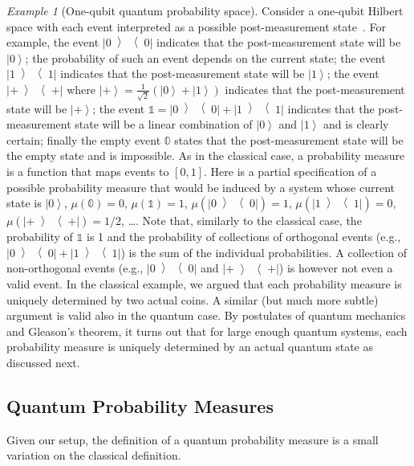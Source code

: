 \documentclass{article}
\theoremstyle{remark}
\newtheorem{example}{Example}
\newcommand{\ket}[1]{{\left\vert{#1}\right\rangle}}
\newcommand{\op}[2]{\ensuremath{\left\vert{#1}\middle\rangle\middle\langle{#2}\right\vert}}
\newcommand{\proj}[1]{\op{#1}{#1}}
\newcommand{\ps}{\texttt{+}}
\begin{document}
\begin{example}[One-qubit quantum probability space] Consider a
  one-qubit Hilbert space with each event interpreted as a possible
  post-measurement state~\cite{peres1995quantum,Mermin2007,Jaeger2007}. 
  For example, the event $\proj{0}$ indicates
  that the post-measurement state will be $\ket{0}$; the probability
  of such an event depends on the current state; the event $\proj{1}$
  indicates that the post-measurement state will be $\ket{1}$; the
  event $\proj{\ps}$ where
  $\ket{\ps}=\frac{1}{\sqrt{2}}(\ket{0}+\ket{1})$ indicates that the
  post-measurement state will be $\ket{\ps}$; the event
  $\mathbb{1}=\proj{0}+\proj{1}$ indicates that the post-measurement
  state will be a linear combination of $\ket{0}$ and $\ket{1}$ and is
  clearly certain; finally the empty event $\mathbb{0}$ states that
  the post-measurement state will be the empty state and is
  impossible. As in the classical case, a probability measure is a
  function that maps events to $[0,1]$. Here is a partial
  specification of a possible probability measure that would be
  induced by a system whose current state is $\ket{0}$,
  $\mu\left(\mathbb{0}\right)=0$, $\mu\left(\mathbb{1}\right)=1$,
  $\mu\left(\proj{0}\right)=1$, $\mu\left(\proj{1}\right)=0$,
  $\mu\left(\proj{\ps}\right)=1/2$, \ldots. Note that, similarly to
  the classical case, the probability of $\mathbb{1}$ is 1 and the
  probability of collections of orthogonal events (e.g.,
  $\proj{0}+\proj{1}$) is the sum of the individual probabilities.  A
  collection of non-orthogonal events (e.g., $\proj{0}$ and
  $\proj{\ps}$) is however not even a valid event. In the classical
  example, we argued that each probability measure is uniquely
  determined by two actual coins. A similar (but much more subtle)
  argument is valid also in the quantum case. By postulates of quantum
  mechanics and Gleason's theorem, it turns out that for large enough
  quantum systems, each probability measure is uniquely determined by
  an actual quantum state as discussed next.
\end{example}

\subsection{Quantum Probability Measures}

Given our setup, the definition of a quantum probability measure is a
small variation on the classical definition. 
\end{document}
